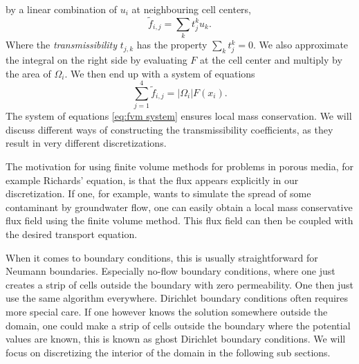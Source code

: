\documentclass[../Main/main.tex]{subfiles}
\begin{document}
	by a linear combination of $u_i$ at neighbouring cell centers,
	\begin{equation}
		\tilde{f}_{i,j} = \sum_{k}t_{j}^k u_k.
	\end{equation}
	Where the \emph{transmissibility } $t_{j,k}$ has the property $\sum_k t_{j}^k = 0$. 
	We also approximate the integral on the right side by evaluating $F$ at the cell center and multiply by the area of $\Omega_i$. We then end up with a system of equations
	\begin{equation}\label{eq:fvm system}
		\sum_{j=1}^4 \tilde{f}_{i,j} = |\Omega_i|F(x_i).
	\end{equation}
	The system of equations \eqref{eq:fvm system} ensures local mass conservation. We will discuss different ways of constructing the transmissibility coefficients, as they result in very different discretizations.
	\par
	The motivation for using finite volume methods for problems in porous media, for example Richards' equation, is that the flux appears explicitly in our discretization. If one, for example, wants to simulate the spread of some contaminant by groundwater flow, one can easily obtain a local mass conservative flux field using the finite volume method. This flux field can then be coupled with the desired transport equation.
	\par 
	When it comes to boundary conditions, this is usually straightforward for Neumann boundaries. Especially no-flow boundary conditions, where one just creates a strip of cells outside the boundary with zero permeability. One then just use the same algorithm everywhere. Dirichlet boundary conditions often requires more special care. If one however knows the solution somewhere outside the domain, one could make a strip of cells outside the boundary where the potential values are known, this is known as ghost Dirichlet boundary conditions. We will focus on discretizing the interior of the domain in the following sub sections.
\end{document}

